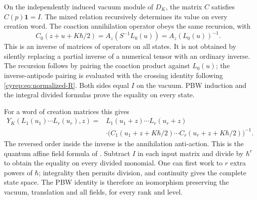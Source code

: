 On the independently induced vacuum module of \(D_K\),
the matrix \(C\) satisfies \(C(p)\mathbf1=I\).
The mixed relation recursively determines its value on every
creation word. The coaction annihilation operator obeys the
same recursion, with
\begin{equation}\label{cyrep:eq:annihilation-inverse}
 C_0(z+u+K\hbar/2)
 =A_z(S^{-1}L_0(u))=A_z(L_0(u))^{-1}.
\end{equation}
This is an inverse of matrices of operators on all states.
It is not obtained by silently replacing a partial inverse
of a numerical tensor with an ordinary inverse.
The recursion follows by pairing the coaction product against
\(L_0(u)\); the inverse-antipode pairing is evaluated with
the crossing identity following \eqref{cyrep:eq:normalized-R}.
Both sides equal \(I\) on the vacuum.
PBW induction and the integral divided formulas prove the
equality on every state.

For a word of creation matrices this gives
\begin{equation}\label{cyrep:eq:all-fields}
\begin{split}
 Y_K(L_1(u_1)\cdots L_r(u_r),z)
 ={}&L_1(u_1+z)\cdots L_r(u_r+z)\\
 &\cdot\bigl(C_1(u_1+z+K\hbar/2)\cdots
             C_r(u_r+z+K\hbar/2)\bigr)^{-1}.
\end{split}
\end{equation}
The reversed order inside the inverse is the annihilation
anti-action. This is the quantum affine field formula of
\cite[Section 2.1, equation (2.10)]{EtingofKazhdanV}.
Subtract \(I\) in each input matrix and divide by \(\hbar^r\)
to obtain the equality on every divided monomial.
One can first work to \(r\) extra powers of \(\hbar\);
integrality then permits division, and continuity gives
the complete state space.
The PBW identity is therefore an isomorphism preserving the
vacuum, translation and all fields, for every rank and level.

